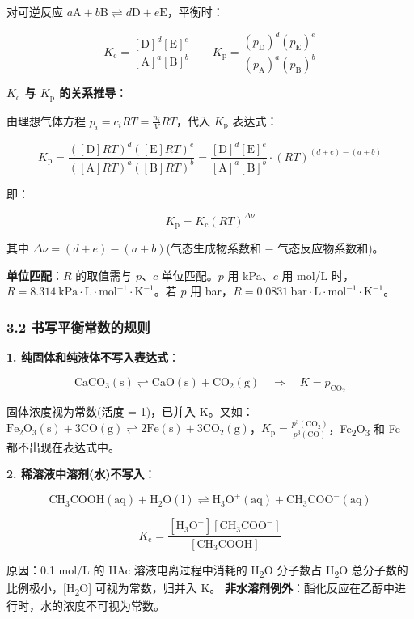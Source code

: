 \documentclass[a4paper,11pt]{ctexart}
\newcommand{\箭}{\ensuremath{\rightarrow}}
\newcommand{\左箭}{\ensuremath{\leftarrow}}
\newcommand{\上箭}{\ensuremath{\uparrow}}
\newcommand{\下箭}{\ensuremath{\downarrow}}
\newcommand{\衡}{\ensuremath{\rightleftharpoons}}
\newcommand{\双箭}{\ensuremath{\leftrightarrow}}
\newcommand{\约等于}{\ensuremath{\approx}}
\newcommand{\小于等于}{\ensuremath{\leq}}
\newcommand{\大于等于}{\ensuremath{\geq}}
\newcommand{\不等于}{\ensuremath{\neq}}
\newcommand{\西格马}{\ensuremath{\sigma}}
\newcommand{\派}{\ensuremath{\pi}}
\begin{document}
对可逆反应 \(a\mathrm{A} + b\mathrm{B} \rightleftharpoons d\mathrm{D} + e\mathrm{E}\)，平衡时：

\[
K_{\mathrm c} = \frac{[\mathrm{D}]^d[\mathrm{E}]^e}{[\mathrm{A}]^a[\mathrm{B}]^b} \qquad K_{\mathrm p} = \frac{(p_\mathrm{D})^d(p_\mathrm{E})^e}{(p_\mathrm{A})^a(p_\mathrm{B})^b}
\]

\textbf{\(K_{\mathrm c}\) 与 \(K_{\mathrm p}\) 的关系推导}：

由理想气体方程 \(p_i = c_i RT = \frac{n_i}{V}RT\)，代入 \(K_{\mathrm p}\) 表达式：

\[
K_{\mathrm p} = \frac{([\mathrm{D}]RT)^d([\mathrm{E}]RT)^e}{([\mathrm{A}]RT)^a([\mathrm{B}]RT)^b} = \frac{[\mathrm{D}]^d[\mathrm{E}]^e}{[\mathrm{A}]^a[\mathrm{B}]^b} \cdot (RT)^{(d+e)-(a+b)}
\]

即：

\[
\boxed{K_{\mathrm p} = K_{\mathrm c}(RT)^{\Delta\nu}}
\]

其中 \(\Delta\nu = (d+e) - (a+b)\)(气态生成物系数和 − 气态反应物系数和)。

\textbf{单位匹配}：\(R\) 的取值需与 \(p\)、\(c\) 单位匹配。\(p\) 用 kPa、\(c\) 用 mol/L 时，\(R = 8.314\ \mathrm{kPa \cdot L \cdot mol^{-1} \cdot K^{-1}}\)。若 \(p\) 用 bar，\(R = 0.0831\ \mathrm{bar \cdot L \cdot mol^{-1} \cdot K^{-1}}\)。

\subsubsection{3.2 书写平衡常数的规则}\label{ux4e66ux5199ux5e73ux8861ux5e38ux6570ux7684ux89c4ux5219}

\textbf{1. 纯固体和纯液体不写入表达式}：

\[
\mathrm{CaCO_3(s) \rightleftharpoons CaO(s) + CO_2(g)} \quad \Rightarrow \quad K = p_{\mathrm{CO_2}}
\]

固体浓度视为常数(活度 = 1)，已并入 K。又如：\(\mathrm{Fe_2O_3(s) + 3CO(g) \rightleftharpoons 2Fe(s) + 3CO_2(g)}\)，\(K_{\mathrm p} = \frac{p^3(\mathrm{CO_2})}{p^3(\mathrm{CO})}\)，Fe\textsubscript{2}O\textsubscript{3} 和 Fe 都不出现在表达式中。

\textbf{2. 稀溶液中溶剂(水)不写入}：

\[
\mathrm{CH_3COOH(aq) + H_2O(l) \rightleftharpoons H_3O^+(aq) + CH_3COO^-(aq)}
\]

\[
K_{\mathrm c} = \frac{[\mathrm{H_3O^+}][\mathrm{CH_3COO^-}]}{[\mathrm{CH_3COOH}]}
\]

原因：0.1 mol/L 的 HAc 溶液电离过程中消耗的 H\textsubscript{2}O 分子数占 H\textsubscript{2}O 总分子数的比例极小，{[}H\textsubscript{2}O{]} 可视为常数，归并入 K。
\textbf{非水溶剂例外}：酯化反应在乙醇中进行时，水的浓度不可视为常数。
\end{document}
